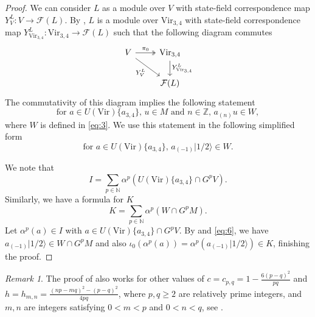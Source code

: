 \documentclass[a4paper, 12pt, reqno]{amsart}
\theoremstyle{remark}
\newtheorem{remark}[theorem]{Remark}
\newcommand{\vachalf}{{|1/2\rangle}}
\newcommand{\Vir}{{\mathrm{Vir}}}
\begin{document}
\begin{proof}
  We can consider $L$ as a module over $V$ with state-field correspondence map $Y^L_{V}: V \to \mathcal{F}(L)$.
  By \cite[Theorem 4.2]{wang_rationality_1993}, $L$ is a module over $\Vir_{3,4}$ with state-field correspondence map $Y^L_{\Vir_{3, 4}}: \Vir_{3, 4} \to \mathcal{F}(L)$ such that the following diagram commutes
  \begin{equation*}
    \begin{tikzcd}
      V \arrow[r, "\pi_0", two heads] \arrow[rd, "{Y^{L}_{V}}"'] & {\Vir_{3, 4}} \arrow[d, "{Y^{L}_{\Vir_{3, 4}}}"] \\
      & {\mathcal{F}(L)}
    \end{tikzcd}
  \end{equation*}
  The commutativity of this diagram implies the following statement
  \begin{equation*}
    \text{for $a \in U(\Vir)\{a_{3, 4}\}$, $u \in M$ and $n \in \mathbb{Z}$, $a_{(n)}u \in W$},
  \end{equation*}
  where $W$ is defined in \eqref{eq:3}.
  We use this statement in the following simplified form
  \begin{equation}
    \label{eq:6}
    \text{for $a \in U(\Vir)\{a_{3, 4}\}$, $a_{(-1)}\vachalf \in W$}.
  \end{equation}

  We note that
  \begin{equation*}
    I = \sum_{p \in \mathbb{N}}\alpha^p(U(\Vir)\{a_{3, 4}\} \cap G^pV).
  \end{equation*}
  Similarly, we have a formula for $K$
  \begin{equation*}
    K = \sum_{p \in \mathbb{N}}\alpha^p(W \cap G^pM).
  \end{equation*}
  Let $\alpha^p(a) \in I$ with $a \in U(\Vir)\{a_{3, 4}\} \cap G^pV$.
  By  and \eqref{eq:6}, we have $a_{(-1)}\vachalf \in W \cap G^pM$ and also $\iota_0(\alpha^p(a)) = \alpha^p(a_{(-1)}\vachalf) \in K$, finishing the proof.
\end{proof}

\begin{remark}
  \label{rmk:5}
  The proof of  also works for other values of $c = c_{p, q} = 1 - \frac{6(p - q)^2}{pq}$ and $h = h_{m, n} = \frac{(np - mq)^2 - (p - q)^2}{4pq}$, where $p, q \ge 2$ are relatively prime integers, and $m, n$ are integers satisfying $0 < m < p$ and $0 < n < q$, see \cite{wang_rationality_1993}.
\end{remark}
\end{document}
